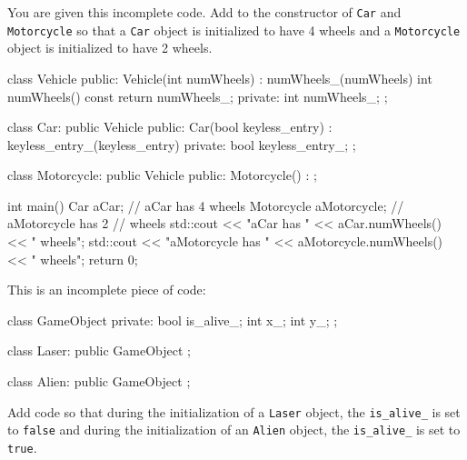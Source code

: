 \begin{ex} You are given this incomplete code. Add to the
constructor of \verb!Car! and \verb!Motorcycle! so that a \verb!Car!
object is initialized to have 4 wheels and a \verb!Motorcycle! object is
initialized to have 2 wheels.
\begin{console}
class Vehicle
{
public:
        Vehicle(int numWheels)
           : numWheels_(numWheels)
        {}
        int numWheels() const { return numWheels_; }
private:
        int numWheels_;
};

class Car: public Vehicle
{
public:
        Car(bool keyless_entry)
           : keyless_entry_(keyless_entry)
        {}
private:
        bool keyless_entry_;
};

class Motorcycle: public Vehicle
{
public:
        Motorcycle()
            :
        {}
};

int main()
{   
    Car aCar;               // aCar has 4 wheels
    Motorcycle aMotorcycle; // aMotorcycle has 2
                            // wheels
    std::cout << "aCar has "
              << aCar.numWheels() << " wheels\n";
    std::cout << "aMotorcycle has "
              << aMotorcycle.numWheels()
              << " wheels\n";
    return 0;
}
\end{console}
\end{ex}
\begin{ex}
This is an incomplete piece of code:
\begin{console}
class GameObject
{
private:
        bool is_alive_;
        int x_;
        int y_;
};

class Laser: public GameObject
{
};

class Alien: public GameObject
{
};
\end{console}
\end{ex}
Add code so that during the initialization of a \verb!Laser! object, the
\verb!is_alive_! is set to \verb!false! and during the initialization
of an \verb!Alien! object, the \verb!is_alive_! is set to \verb!true!.

